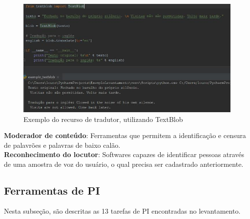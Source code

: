 \documentclass{article}
\begin{document}
    \begin{figure}[H]
        \centering
        \includegraphics[scale=0.45]{imagens/tradutor.jpg}
        \caption{Exemplo do recurso de tradutor, utilizando TextBlob}
        \label{fig:tradutor}
    \end{figure}
\textbf{Moderador de conteúdo}: Ferramentas que permitem a identificação e censura de palavrões e palavras de baixo calão. \\
\textbf{Reconhecimento do locutor}: Softwares capazes de identificar pessoas através de uma amostra de voz do usuário, o qual precisa ser cadastrado anteriormente. \\

\subsection{Ferramentas de PI}
Nesta subseção, são descritas as 13 tarefas de PI encontradas no levantamento. \\
\end{document}
